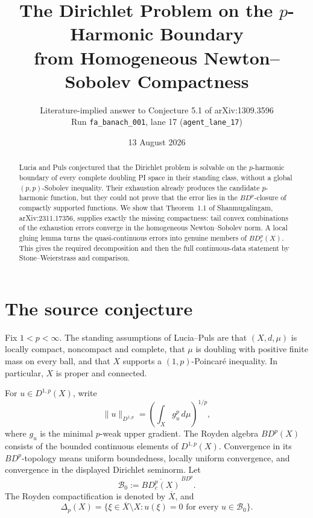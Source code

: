 \documentclass[11pt]{article}
\title{The Dirichlet Problem on the $p$-Harmonic Boundary\\
from Homogeneous Newton--Sobolev Compactness}
\author{Literature-implied answer to Conjecture 5.1 of arXiv:1309.3596\\
Run \texttt{fa\_banach\_001}, lane 17
(\texttt{agent\_lane\_17})}
\date{13 August 2026}
\newcommand{\BD}{BD^p(X)}
\newcommand{\BDc}{BD_c^p(X)}
\newcommand{\DN}{D^{1,p}(X)}
\newcommand{\DeltaP}{\Delta_p(X)}
\newcommand{\Rbar}{\overline X}
\begin{document}
\maketitle

\begin{abstract}
Lucia and Puls conjectured that the Dirichlet problem is solvable on the
$p$-harmonic boundary of every complete doubling PI space in their standing
class, without a global $(p,p)$-Sobolev inequality.  Their exhaustion already
produces the candidate $p$-harmonic function, but they could not prove that
the error lies in the $BD^p$-closure of compactly supported functions.  We
show that Theorem~1.1 of Shanmugalingam, arXiv:2311.17356, supplies exactly
the missing compactness: tail convex combinations of the exhaustion errors
converge in the homogeneous Newton--Sobolev norm.  A local gluing lemma turns
the quasi-continuous errors into genuine members of $BD_c^p(X)$.  This gives
the required decomposition and then the full continuous-data statement by
Stone--Weierstrass and comparison.
\end{abstract}

\begin{center}
\end{center}

\section{The source conjecture}

Fix $1<p<\infty$.  The standing assumptions of Lucia--Puls are that
$(X,d,\mu)$ is locally compact, noncompact and complete, that $\mu$ is
doubling with positive finite mass on every ball, and that $X$ supports a
$(1,p)$-Poincar\'e inequality.  In particular, $X$ is proper and connected.

For $u\in\DN$, write
\[
 \|u\|_{D^{1,p}}=\left(\int_X g_u^p\,d\mu\right)^{1/p},
\]
where $g_u$ is the minimal $p$-weak upper gradient.  The Royden algebra
$\BD$ consists of the bounded continuous elements of $\DN$.
Convergence in its $BD^p$-topology means uniform boundedness, locally uniform
convergence, and convergence in the displayed Dirichlet seminorm.  Let
\[
 \mathcal B_0:=\overline{\BDc}^{\,BD^p}.
\]
The Royden compactification is denoted by $\Rbar$, and
\[
 \DeltaP=\{\xi\in\Rbar\setminus X:u(\xi)=0
            \text{ for every }u\in\mathcal B_0\}.
\]
\end{document}

